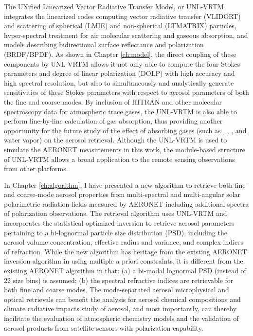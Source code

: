 The UNified Linearized Vector Radiative Transfer Model, or UNL-VRTM integrates
the linearized codes computing vector radiative transfer (VLIDORT) and
scattering of spherical (LMIE) and non-spherical (LTMATRIX) particles, 
hyper-spectral treatment for air molecular scattering and gaseous absorption,
and models describing bidirectional surface reflectance and polarization
(BRDF/BPDF). As shown in Chapter \ref{ch:model}, the direct coupling of these
components by UNL-VRTM allows it not only able to compute the four Stokes
parameters and degree of linear polarization (DOLP) with high accuracy and high
spectral resolution, but also to simultaneously and analytically generate
sensitivities of these Stokes parameters with respect to aerosol parameters of
both the fine and coarse modes. By inclusion of HITRAN and other molecular
spectroscopy data for atmospheric trace gases, the UNL-VRTM is also able to
perform line-by-line calculation of gas absorption, thus providing another
opportunity for the future study of the effect of absorbing gases (such as
, , , and water vapor) on the aerosol retrieval. 
Although the UNL-VRTM is used to simulate the AERONET measurements in
this work, the module-based structure of UNL-VRTM allows a broad application
to the remote sensing observations from other platforms.

In Chapter \ref{ch:algorithm}, I have presented a new algorithm to 
retrieve both fine- and coarse-mode aerosol properties from multi-spectral 
and multi-angular solar polarimetric radiation fields measured by AERONET 
including additional spectra of polarization observations. 
The retrieval algorithm uses UNL-VRTM and incorporates the
statistical optimized inversion to retrieve aerosol parameters pertaining to a
bi-lognormal particle size distribution (PSD), including the aerosol volume
concentration, effective radius and variance, and complex indices of
refraction. While the new algorithm has heritage from the existing AERONET
inversion algorithm in using multiple a priori constraints, it is different
from the existing AERONET algorithm in that: (a) a bi-modal lognormal PSD
(instead of 22 size bins) is assumed; (b) the spectral refractive indices are
retrievable for both fine and coarse modes. The mode-separated aerosol
microphysical and optical retrievals can benefit the analysis for aerosol
chemical compositions and climate radiative impacts study of aerosol, 
and most importantly, can thereby facilitate the evaluation of
atmospheric chemistry models and the validation of aerosol products from
satellite sensors with polarization capability.  

